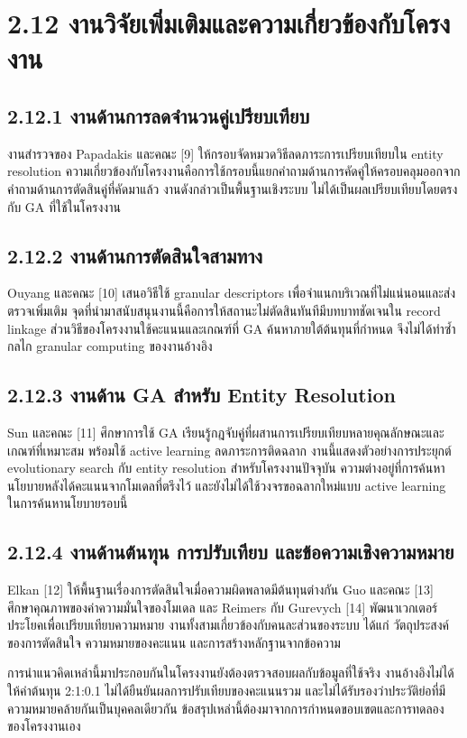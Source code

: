 \section*{2.12 งานวิจัยเพิ่มเติมและความเกี่ยวข้องกับโครงงาน}
\subsection*{2.12.1 งานด้านการลดจำนวนคู่เปรียบเทียบ}
งานสำรวจของ Papadakis และคณะ [9] ให้กรอบจัดหมวดวิธีลดภาระการเปรียบเทียบใน entity resolution ความเกี่ยวข้องกับโครงงานคือการใช้กรอบนี้แยกคำถามด้านการคัดคู่ให้ครอบคลุมออกจากคำถามด้านการตัดสินคู่ที่คัดมาแล้ว งานดังกล่าวเป็นพื้นฐานเชิงระบบ ไม่ได้เป็นผลเปรียบเทียบโดยตรงกับ GA ที่ใช้ในโครงงาน

\subsection*{2.12.2 งานด้านการตัดสินใจสามทาง}
Ouyang และคณะ [10] เสนอวิธีใช้ granular descriptors เพื่อจำแนกบริเวณที่ไม่แน่นอนและส่งตรวจเพิ่มเติม จุดที่นำมาสนับสนุนงานนี้คือการให้สถานะไม่ตัดสินทันทีมีบทบาทชัดเจนใน record linkage ส่วนวิธีของโครงงานใช้คะแนนและเกณฑ์ที่ GA ค้นหาภายใต้ต้นทุนที่กำหนด จึงไม่ได้ทำซ้ำกลไก granular computing ของงานอ้างอิง

\subsection*{2.12.3 งานด้าน GA สำหรับ Entity Resolution}
Sun และคณะ [11] ศึกษาการใช้ GA เรียนรู้กฎจับคู่ที่ผสานการเปรียบเทียบหลายคุณลักษณะและเกณฑ์ที่เหมาะสม พร้อมใช้ active learning ลดภาระการติดฉลาก งานนี้แสดงตัวอย่างการประยุกต์ evolutionary search กับ entity resolution สำหรับโครงงานปัจจุบัน ความต่างอยู่ที่การค้นหานโยบายหลังได้คะแนนจากโมเดลที่ตรึงไว้ และยังไม่ได้ใช้วงจรขอฉลากใหม่แบบ active learning ในการค้นหานโยบายรอบนี้

\subsection*{2.12.4 งานด้านต้นทุน การปรับเทียบ และข้อความเชิงความหมาย}
Elkan [12] ให้พื้นฐานเรื่องการตัดสินใจเมื่อความผิดพลาดมีต้นทุนต่างกัน Guo และคณะ [13] ศึกษาคุณภาพของค่าความมั่นใจของโมเดล และ Reimers กับ Gurevych [14] พัฒนาเวกเตอร์ประโยคเพื่อเปรียบเทียบความหมาย งานทั้งสามเกี่ยวข้องกับคนละส่วนของระบบ ได้แก่ วัตถุประสงค์ของการตัดสินใจ ความหมายของคะแนน และการสร้างหลักฐานจากข้อความ

การนำแนวคิดเหล่านี้มาประกอบกันในโครงงานยังต้องตรวจสอบผลกับข้อมูลที่ใช้จริง งานอ้างอิงไม่ได้ให้ค่าต้นทุน 2:1:0.1 ไม่ได้ยืนยันผลการปรับเทียบของคะแนนรวม และไม่ได้รับรองว่าประวัติย่อที่มีความหมายคล้ายกันเป็นบุคคลเดียวกัน ข้อสรุปเหล่านี้ต้องมาจากการกำหนดขอบเขตและการทดลองของโครงงานเอง

